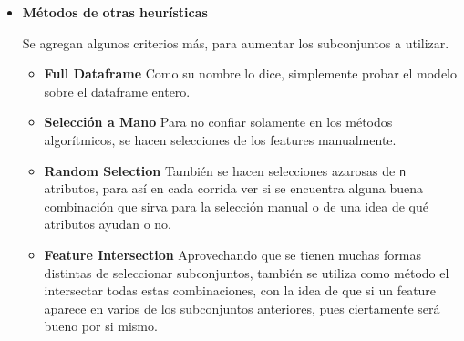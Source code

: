 \documentclass[a4paper]{article}
\begin{document}
\begin {itemize}
\begin{itemize}
	\item \textbf{Stepwise Selection}

	Este método es una combinación de ambos métodos descritos anteriormente. La idea es partir de una lista vacía como en Forward Selection, y agregar siempre el mejor atributo posible (como Forward Selection). Luego, una vez que se tiene el mejor atributo, se busca recursivamente con Backward Elimination si algún atributo sobra. Es una forma sabia de moverse a traves de los atributos; en cada paso se agrega el mejor posible y saca todos los que empeoraban esa nueva combinación.

\end{itemize}

El mayor problema de estos tres métodos es que, si bien son efectivos en los subconjuntos encontrados, son muy costosos en tiempo (como todo algoritmo de fuerza bruta). Pensar que se hacen \texttt{n} iteraciones (siendo \texttt{n} la cantidad de features) y para cada una de esas iteraciones se hacen \texttt{n} más (y ni pensar en Stepwise Selection, que hace aún \texttt{n} más). Pasados los 100 features ya esto pasa a ser increiblemente costoso. Es por esto que se le agrega una condición de corte, donde si para las x iteraciones no se encuentra una mejora simplemente se corte el proceso. Si bien esto plantea la posibilidad de caer en un máximo local, en tiempo termina siendo rendidor.

\item \textbf{Métodos de otras heurísticas}

Se agregan algunos criterios más, para aumentar los subconjuntos a utilizar.

\begin{itemize}

	\item \textbf{Full Dataframe} Como su nombre lo dice, simplemente probar el modelo sobre el dataframe entero.

	\item \textbf{Selección a Mano} Para no confiar solamente en los métodos algorítmicos, se hacen selecciones de los features manualmente.

	\item \textbf{Random Selection} También se hacen selecciones azarosas de \texttt{n} atributos, para así en cada corrida ver si se encuentra alguna buena combinación que sirva para la selección manual o de una idea de qué atributos ayudan o no.

	\item \textbf{Feature Intersection} Aprovechando que se tienen muchas formas distintas de seleccionar subconjuntos, también se utiliza como método el intersectar todas estas combinaciones, con la idea de que si un feature aparece en varios de los subconjuntos anteriores, pues ciertamente será bueno por si mismo.

\end{itemize}														

\end {itemize}
\end{document}
